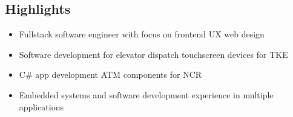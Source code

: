 \documentclass[]{cv}
\begin{document}
\begin{body}
	\section{\vspace{0.05cm} Highlights}
	\begin{itemize}
		\item {Fullstack software engineer with focus on frontend UX web design}
		\item {Software development for elevator dispatch touchscreen devices for TKE}
		\item {C\# app development ATM components for NCR}
		\item {Embedded systems and software development experience in multiple applications \vspace{0.05cm}}
	\end{itemize}

\end{body}
\end{document}
